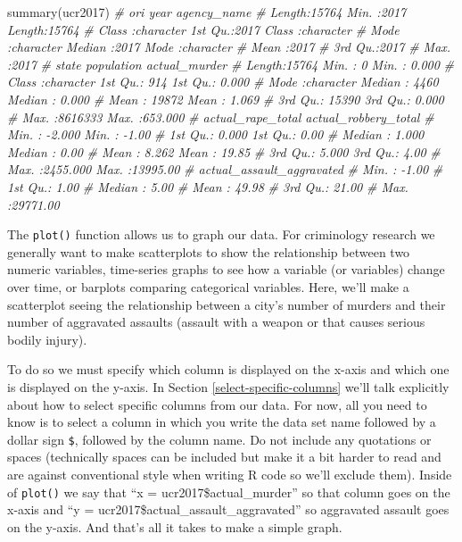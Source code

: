 \documentclass[
  a4paper,
]{krantz}
\makeatletter
\newenvironment{Shaded}{\begin{snugshade}}{\end{snugshade}}
\newcommand{\CommentTok}[1]{\textcolor[rgb]{0.37,0.37,0.37}{\textit{#1}}}
\newcommand{\FunctionTok}[1]{\textcolor[rgb]{0,0,0}{#1}}
\newcommand{\NormalTok}[1]{#1}
\newenvironment{kframe}{%
\medskip{}
\setlength{\fboxsep}{.8em}
 \def\at@end@of@kframe{}%
 \ifinner\ifhmode%
  \def\at@end@of@kframe{\end{minipage}}%
  \begin{minipage}{\columnwidth}%
 \fi\fi%
 \def\FrameCommand##1{\hskip\@totalleftmargin \hskip-\fboxsep
 \colorbox{shadecolor}{##1}\hskip-\fboxsep
     \hskip-\linewidth \hskip-\@totalleftmargin \hskip\columnwidth}%
 \MakeFramed {\advance\hsize-\width
   \@totalleftmargin\z@ \linewidth\hsize
   \@setminipage}}%
 {\par\unskip\endMakeFramed%
 \at@end@of@kframe}
\renewenvironment{Shaded}{\begin{kframe}}{\end{kframe}}
\makeatother
\begin{document}
\begin{Shaded}
\begin{Highlighting}[]
\FunctionTok{summary}\NormalTok{(ucr2017)}
\CommentTok{\#      ori                 year      agency\_name       }
\CommentTok{\#  Length:15764       Min.   :2017   Length:15764      }
\CommentTok{\#  Class :character   1st Qu.:2017   Class :character  }
\CommentTok{\#  Mode  :character   Median :2017   Mode  :character  }
\CommentTok{\#                     Mean   :2017                     }
\CommentTok{\#                     3rd Qu.:2017                     }
\CommentTok{\#                     Max.   :2017                     }
\CommentTok{\#     state             population      actual\_murder    }
\CommentTok{\#  Length:15764       Min.   :      0   Min.   :  0.000  }
\CommentTok{\#  Class :character   1st Qu.:    914   1st Qu.:  0.000  }
\CommentTok{\#  Mode  :character   Median :   4460   Median :  0.000  }
\CommentTok{\#                     Mean   :  19872   Mean   :  1.069  }
\CommentTok{\#                     3rd Qu.:  15390   3rd Qu.:  0.000  }
\CommentTok{\#                     Max.   :8616333   Max.   :653.000  }
\CommentTok{\#  actual\_rape\_total  actual\_robbery\_total}
\CommentTok{\#  Min.   :  {-}2.000   Min.   :   {-}1.00    }
\CommentTok{\#  1st Qu.:   0.000   1st Qu.:    0.00    }
\CommentTok{\#  Median :   1.000   Median :    0.00    }
\CommentTok{\#  Mean   :   8.262   Mean   :   19.85    }
\CommentTok{\#  3rd Qu.:   5.000   3rd Qu.:    4.00    }
\CommentTok{\#  Max.   :2455.000   Max.   :13995.00    }
\CommentTok{\#  actual\_assault\_aggravated}
\CommentTok{\#  Min.   :   {-}1.00         }
\CommentTok{\#  1st Qu.:    1.00         }
\CommentTok{\#  Median :    5.00         }
\CommentTok{\#  Mean   :   49.98         }
\CommentTok{\#  3rd Qu.:   21.00         }
\CommentTok{\#  Max.   :29771.00}
\end{Highlighting}
\end{Shaded}

The \texttt{plot()} function allows us to graph our data.
For criminology research we generally want to make
scatterplots to show the relationship between two numeric
variables, time-series graphs to see how a variable (or
variables) change over time, or barplots comparing
categorical variables. Here, we'll make a scatterplot seeing
the relationship between a city's number of murders and
their number of aggravated assaults (assault with a weapon
or that causes serious bodily injury).

To do so we must specify which column is displayed on the
x-axis and which one is displayed on the y-axis. In Section
\ref{select-specific-columns} we'll talk explicitly about
how to select specific columns from our data. For now, all
you need to know is to select a column in which you write
the data set name followed by a dollar sign \texttt{\$},
followed by the column name. Do not include any quotations
or spaces (technically spaces can be included but make it a
bit harder to read and are against conventional style when
writing R code so we'll exclude them). Inside of
\texttt{plot()} we say that ``x = ucr2017\$actual\_murder''
so that column goes on the x-axis and ``y =
ucr2017\$actual\_assault\_aggravated'' so aggravated assault
goes on the y-axis. And that's all it takes to make a simple
graph.
\end{document}
